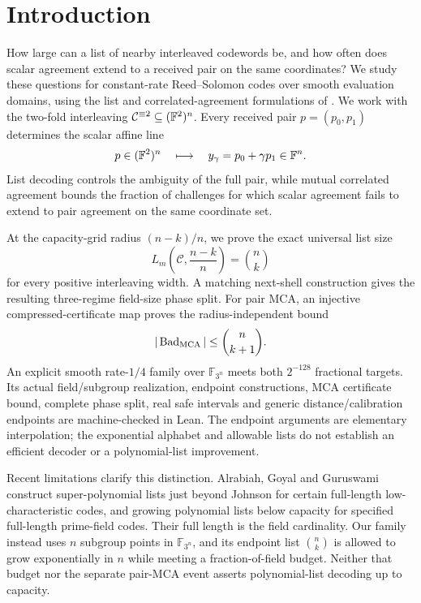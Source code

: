 \section{Introduction}

How large can a list of nearby interleaved codewords be, and how often does
scalar agreement extend to a received pair on the same coordinates? We
study these questions for constant-rate Reed--Solomon codes over smooth
evaluation domains, using the list and correlated-agreement formulations of
\cite{arnonBonehFenzi2026}. We work with the two-fold interleaving
\(\mathcal C^{\equiv 2}\subseteq(\mathbb{F}^2)^n\).  Every received pair
\(p=(p_0,p_1)\) determines the scalar affine line
\[
  p\in(\mathbb{F}^2)^n
  \quad\longmapsto\quad
  y_\gamma=p_0+\gamma p_1\in\mathbb{F}^n .
\]
List decoding controls the ambiguity of the full pair, while mutual correlated
agreement bounds the fraction of challenges for which scalar agreement fails
to extend to pair agreement on the same coordinate set.

At the capacity-grid radius \((n-k)/n\), we prove the exact universal list
size
\[
  L_m\!\left(\mathcal C,\frac{n-k}{n}\right)=\binom nk
\]
for every positive interleaving width.  A matching next-shell construction
gives the resulting three-regime field-size phase split. For pair MCA, an
injective compressed-certificate map proves the radius-independent bound
\[
  |\operatorname{Bad}_{\operatorname{MCA}}|\le\binom n{k+1}.
\]
An explicit smooth rate-\(1/4\) family over \(\mathbb F_{3^n}\) meets both
\(2^{-128}\) fractional targets. Its actual field/subgroup realization,
endpoint constructions, MCA certificate bound, complete phase split, real
safe intervals and generic distance/calibration endpoints are machine-checked
in Lean. The endpoint arguments are elementary interpolation; the exponential
alphabet and allowable lists do not establish an efficient decoder or a
polynomial-list improvement.

Recent limitations clarify this distinction. Alrabiah, Goyal and Guruswami
\cite[Theorems~1.1, 1.2 and~1.4]{alrabiahGoyalGuruswami2026} construct
super-polynomial lists just beyond Johnson for certain full-length
low-characteristic codes, and growing polynomial lists below capacity for
specified full-length prime-field codes. Their full length is the field
cardinality. Our family instead uses \(n\) subgroup points in
\(\mathbb F_{3^n}\), and its endpoint list \(\binom nk\) is allowed to
grow exponentially in \(n\) while meeting a fraction-of-field budget.
Neither that budget nor the separate pair-MCA event asserts polynomial-list
decoding up to capacity.

